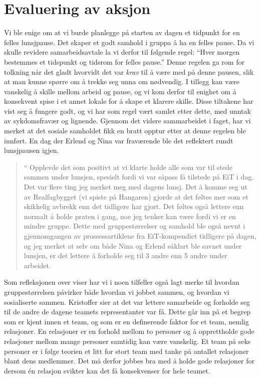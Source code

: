 
\section{Evaluering av aksjon} 

Vi ble enige om at vi burde planlegge på starten av dagen et tidpunkt for en felles lunsjpause. Det skaper et godt samhold i gruppa å ha en felles pause.  Da vi skulle revidere samarbeidsavtale la vi derfor til følgende regel:  ``Hver morgen bestemmes et tidspunkt og tidsrom for felles pause.'' Denne regelen ga rom for tolkning når det gladt hvorvidt det var \emph{krav} til å være med på denne pausen, slik at man kunne spørre om å trekke seg unna om nødvendig. I tillegg kan være vanskelig å skille mellom arbeid og pause, og vi kom derfor til enighet om å konsekvent spise i et annet lokale for å skape et klarere skille. Disse tiltakene har vist seg å fungere godt, og vi har som regel vært samlet etter dette, med unntak av sykdomsfravær og lignende. Gjennom det videre sammarbeidet i faget, har vi merket at det sosiale samholdet fikk en bratt opptur etter at denne regelen ble innført. En dag der Erlend og Nina var fraværende ble det reflektert rundt lunsjpausen igjen.

\begin{quote}``
Opplevde det som positivt at vi klarte holde alle som var til stede sammen under lunsjen, spesielt fordi vi var såpass få tilstede på EiT i dag. Det var flere ting jeg merket meg med dagens lunsj. Det å komme seg ut av Realfagbygget (vi spiste på Hangaren) gjorde at det føltes mer som et skikkelig avbrekk enn det tidligere har gjort. Det føltes også lettere enn normalt å holde praten i gang, noe jeg tenker kan være fordi vi er en mindre gruppe. Dette med gruppestørrelser og samhold ble også nevnt i gjennomgangen av prossessartiklene fra EiT-kompendiet tidligere på dagen, og jeg merket at selv om både Nina og Erlend såklart ble savnet under lunsjen, er det lettere å forholde seg til 3 andre enn 5 andre under arbeidet.
\end{quote} 

Som refleksjonen over viser har vi i noen tilfeller også lagt merke til hvordan gruppestørrelsen påvirker både hvordan vi jobbet sammen, og hvordan vi sosialiserte sammen. Kristoffer sier at det var lettere samarbeide og forholde seg til de andre de dagene teamets representanter var få. Dette går inn på et begrep som er kjent innen et team, og som er en definerende faktor for et team, nemlig relasjoner. 
En relasjoner er en forhold mellom to personer og å opprettholde gode relasjoner mellom mange personer samtidig
kan være vanskelig. Et team på seks personer er i følge teorien  \cite{Artikkel4} et litt for stort team med tanke på antallet relasjoner
blant dens medlemmer. Det må derfor jobbes bra med å holde gode relasjoner for dersom én relasjon svikter kan det få 
konsekvenser for hele teamet. 

